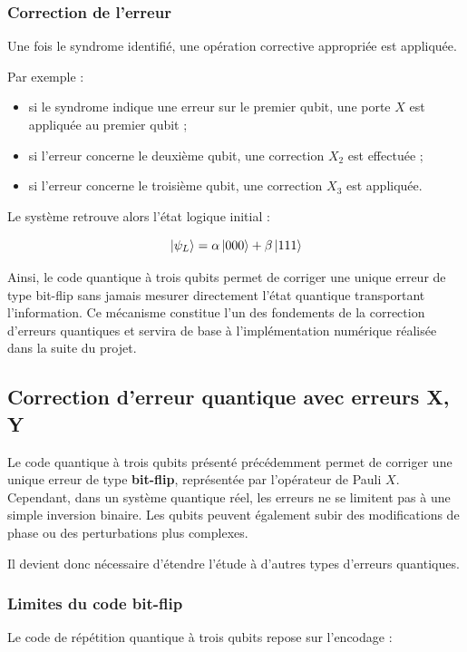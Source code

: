 \documentclass[a4paper,12pt]{article}
\begin{document}
\subsubsection{Correction de l’erreur}

Une fois le syndrome identifié, une opération corrective appropriée est appliquée.

Par exemple :

\begin{itemize}
    \item si le syndrome indique une erreur sur le premier qubit, une porte $X$ est appliquée au premier qubit ;
    \item si l’erreur concerne le deuxième qubit, une correction $X_2$ est effectuée ;
    \item si l’erreur concerne le troisième qubit, une correction $X_3$ est appliquée.
\end{itemize}

Le système retrouve alors l’état logique initial :

\[
\ket{\psi_L}
=
\alpha\ket{000}
+
\beta\ket{111}
\]

Ainsi, le code quantique à trois qubits permet de corriger une unique erreur de type bit-flip sans jamais mesurer directement l’état quantique transportant l’information. Ce mécanisme constitue l’un des fondements de la correction d’erreurs quantiques et servira de base à l’implémentation numérique réalisée dans la suite du projet.

\subsection{Correction d'erreur quantique avec erreurs X, Y}

Le code quantique à trois qubits présenté précédemment permet de corriger une unique erreur de type \textbf{bit-flip}, représentée par l’opérateur de Pauli $X$. Cependant, dans un système quantique réel, les erreurs ne se limitent pas à une simple inversion binaire. Les qubits peuvent également subir des modifications de phase ou des perturbations plus complexes.

Il devient donc nécessaire d’étendre l’étude à d’autres types d’erreurs quantiques.

\subsubsection{Limites du code bit-flip}

Le code de répétition quantique à trois qubits repose sur l’encodage :
\end{document}
